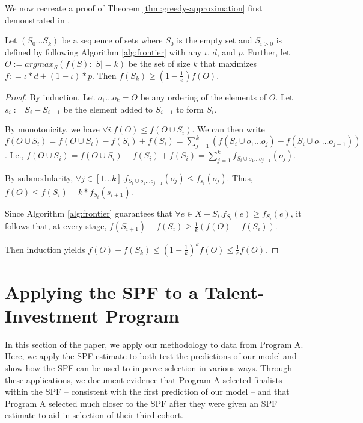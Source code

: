 We now recreate a proof of Theorem \ref{thm:greedy-approximation} first demonstrated in \cite{nemhauser1978analysis}.

\begin{theorem}\label{thm:greedy-approximation}
    Let $(S_0...S_k)$ be a sequence of sets where $S_0$ is the empty set and $S_{i>0}$ is defined by following Algorithm \ref{alg:frontier} with any $\iota$, $d$, and $p$. Further, let $O := argmax_S(f(S) : |S| = k)$ be the set of size $k$ that maximizes $f: = \iota*d+(1-\iota)*p$. Then $f(S_k) \geq (1 - \frac{1}{e})f(O)$.
\end{theorem}

\begin{proof}
By induction. Let ${o_1...o_k} = O$ be any ordering of the elements of $O$. Let ${s_i} := S_i - S_{i-1}$ be the element added to $S_{i-1}$ to form $S_i$.

By monotonicity, we have $\forall i . f(O) \leq f(O \cup S_i)$.  We can then write $f(O \cup S_i) = f(O \cup S_i) - f(S_i) + f(S_i) = \sum_{j=1}^{k} (f(S_i \cup {o_1...o_j}) - f(S_i \cup {o_1...o_{j-1}}))$. I.e., $f(O \cup S_i) = f(O \cup S_i) - f(S_i) + f(S_i) = \sum_{j=1}^{k} f_{S_i \cup {o_1...o_{j-1}}}(o_j)$.

By submodularity, $\forall j \in [1...k] . f_{S_i \cup {o_1...o_{j-1}}}(o_j) \leq f_{s_i}(o_j)$. Thus, $f(O) \leq f(S_i) + k*f_{S_i}(s_{i+1})$. 

Since Algorithm \ref{alg:frontier} guarantees that $\forall e \in X - S_i . f_{S_i}(e) \geq f_{S_i}(e)$, it follows that, at every stage, $f(S_{i+1}) - f(S_i) \geq \frac{1}{k} (f(O) - f(S_i))$.

Then induction yields $f(O) - f(S_k) \leq (1 - \frac{1}{k})^k f(O) \leq \frac{1}{e} f(O)$.
\end{proof}

\section{Applying the SPF to a Talent-Investment Program}\label{sec:case}

In this section of the paper, we apply our methodology to data from Program A. Here, we apply the SPF estimate to both test the predictions of our model and show how the SPF can be used to improve selection in various ways. Through these applications, we document evidence that Program A selected finalists within the SPF -- consistent with the first prediction of our model -- and that Program A selected much closer to the SPF after they were given an SPF estimate to aid in selection of their third cohort.

